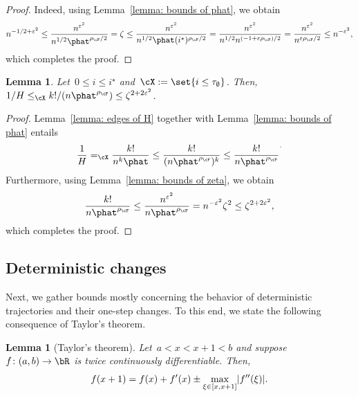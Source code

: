 \documentclass[11pt]{amsart}
\newcommand{\eps}{\varepsilon}
\DeclarePairedDelimiter{\abs}{\lvert}{\rvert}
\newcommand{\Xleq}{\leq_{\cX}}
\newcommand{\Xeq}{=_{\cX}}
\newtheorem{lemma}[algocf]{Lemma}
\theoremstyle{definition}
\numberwithin{equation}{section}
\begin{document}
	\begin{proof}
		Indeed, using Lemma~\ref{lemma: bounds of phat}, we obtain
		\begin{equation*}
			n^{-1/2+\eps^2}
			\leq \frac{n^{\eps^2}}{n^{1/2}\phat^{\rho_\cF/2}}
			=\zeta
			\leq \frac{n^{\eps^2}}{n^{1/2}\phat(i^\star)^{\rho_\cF/2}}
			=\frac{n^{\eps^2}}{n^{1/2}n^{(-1+\eps\rho_\cF)/2}}
			=\frac{n^{\eps^2}}{n^{\eps\rho_\cF/2}}
			\leq n^{-\eps^2},
		\end{equation*}
		which completes the proof.
	\end{proof}
	
	\begin{lemma}\label{lemma: zeta and H}
		Let~$0\leq i\leq i^\star$ and~$\cX:=\set{i\leq\tau_\emptyset}$.
		Then,~$1/H\Xleq k!/(n\phat^{\rho_\cF})\leq \zeta^{2+2\eps^2}$.
	\end{lemma}
	
	\begin{proof}
		Lemma~\ref{lemma: edges of H} together with Lemma~\ref{lemma: bounds of phat} entails
		\begin{equation*}
			\frac{1}{H}
			\Xeq \frac{k!}{n^k\phat}
			\leq \frac{k!}{(n\phat^{\rho_\cF})^k}
			\leq \frac{k!}{n\phat^{\rho_\cF}}^.
		\end{equation*}
		Furthermore, using Lemma~\ref{lemma: bounds of zeta}, we obtain
		\begin{equation*}
			\frac{k!}{n\phat^{\rho_\cF}}
			\leq \frac{n^{\eps^2}}{n\phat^{\rho_\cF}}
			= n^{-\eps^2}\zeta^2
			\leq \zeta^{2+2\eps^2},
		\end{equation*}
		which completes the proof.
	\end{proof}
	
	\subsection{Deterministic changes}
	Next, we gather bounds mostly concerning the behavior of deterministic trajectories and their one-step changes.
	To this end, we state the following consequence of Taylor's theorem.
	
	\begin{lemma}[Taylor's theorem]\label{lemma: taylor}
		Let~$a<x<x+1<b$ and suppose~$f\colon (a,b)\rightarrow\bR$ is twice continuously differentiable.
		Then,
		\begin{equation*}
			f(x+1)=f(x)+f'(x)\pm \max_{\xi\in [x,x+1]}\abs{f''(\xi)}.
		\end{equation*}
	\end{lemma}
	
\end{document}
